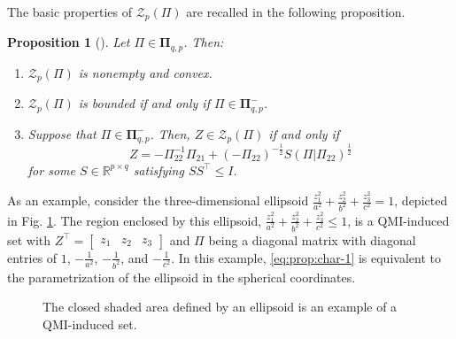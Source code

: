 \documentclass[pdflatex,sn-mathphys-num]{sn-jnl}%
\theoremstyle{thmstyleone}
\newtheorem{proposition}[theorem]{Proposition}
\begin{document}
The basic properties of $\mathcal{Z}_p(\Pi)$ are recalled
in the following proposition. 

\begin{proposition}[{\cite[Thms. 3.2 and 3.3]{van2023quadratic}}]
\label{prop:qmi}
Let $\Pi\in\pmb{\Pi}_{q,p}$. Then:
\begin{enumerate}[label=\normalfont{(\alph*)},ref=\ref{prop:qmi}(\alph*)]
    \item\label{prop:qmi-a} $\mathcal{Z}_p(\Pi)$ is nonempty and convex.
    \item\label{prop:qmi-b} $\mathcal{Z}_p(\Pi)$ is bounded if and only if $\Pi\in\pmb{\Pi}_{q,p}^-$.
    \item\label{prop:qmi-c} Suppose that $\Pi\in\pmb{\Pi}_{q,p}^-$. Then, $Z\in\mathcal{Z}_p(\Pi)$ if and only if
    \begin{equation}
    \label{eq:prop:char-1}
    Z=-\Pi_{22}^{-1} \Pi_{21} + (-\Pi_{22})^{-\frac{1}{2}} S (\Pi|\Pi_{22})^{\frac{1}{2}}
    \end{equation}
    for some $S\in\mathbb{R}^{p\times q}$ satisfying $SS^\top\leq I$. 
\end{enumerate}
\end{proposition}

As an example, consider the three-dimensional ellipsoid $\tfrac{z_1^2}{a^2}+\tfrac{z_2^2}{b^2}+\tfrac{z_3^2}{c^2}=1$, depicted in Fig. \ref{fig:2}. The region enclosed by this ellipsoid, $\tfrac{z_1^2}{a^2}+\tfrac{z_2^2}{b^2}+\tfrac{z_3^2}{c^2}\leq1$, is a QMI-induced set with $Z^\top=\begin{bmatrix}
z_1 & z_2 & z_3
\end{bmatrix}$ and $\Pi$ being a diagonal matrix with diagonal entries of $1$, $-\tfrac{1}{a^2}$, $-\tfrac{1}{b^2}$, and $-\tfrac{1}{c^2}$. In this example, \eqref{eq:prop:char-1} is equivalent to the parametrization of the ellipsoid in the spherical coordinates. 

\begin{figure}[h]
    \centering
    \caption{The closed shaded area defined by an ellipsoid is an example of a QMI-induced set.}
    \label{fig:2}
\end{figure}
\end{document}
